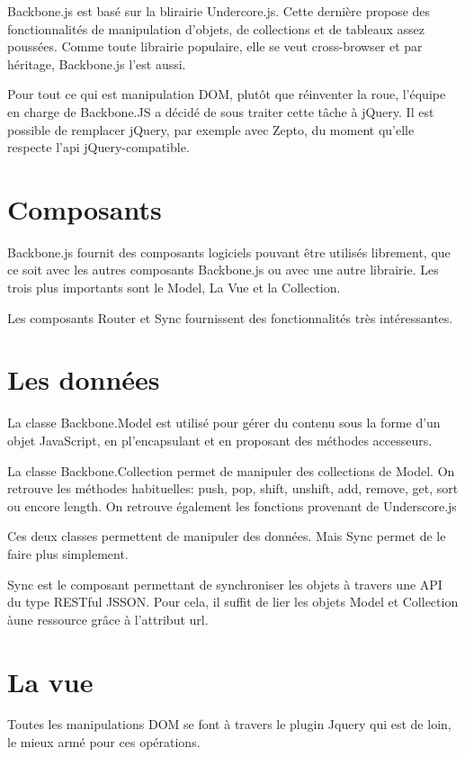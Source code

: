 Backbone.js est basé sur la blirairie Undercore.js. Cette dernière propose des fonctionnalités de manipulation d’objets, de collections et de tableaux assez poussées. Comme toute librairie populaire, elle se veut cross-browser et par héritage, Backbone.js l’est aussi.

Pour tout ce qui est manipulation DOM, plutôt que réinventer la roue, l’équipe en charge de Backbone.JS a décidé de sous traiter cette tâche à jQuery. Il est possible de remplacer jQuery, par exemple avec Zepto, du moment qu’elle respecte l’api jQuery-compatible.

\section*{Composants}


Backbone.js fournit des composants logiciels pouvant être utilisés librement, que ce soit avec les autres composants Backbone.js ou avec une autre librairie. Les trois plus importants sont le Model, La Vue et la Collection.

Les composants Router et Sync fournissent des fonctionnalités très intéressantes.


\section*{Les données}


La classe Backbone.Model est utilisé pour gérer du contenu sous la forme d’un objet JavaScript, en pl’encapsulant et en proposant des méthodes accesseurs.

La classe Backbone.Collection permet de manipuler des collections de Model. On retrouve les méthodes habituelles: push, pop, shift, unshift, add, remove, get, sort ou encore length. On retrouve également les fonctions provenant de Underscore.js

Ces deux classes permettent de manipuler des données. Mais Sync permet de le faire plus simplement.

Sync est le composant permettant de synchroniser les objets à travers une API du type RESTful JSSON. Pour cela, il suffit de lier les objets Model et Collection àune ressource grâce à l’attribut url.

\section*{La vue}

Toutes les manipulations DOM se font à travers le plugin Jquery qui est de loin, le mieux armé pour ces opérations.


